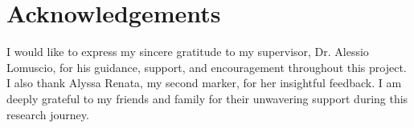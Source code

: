 \chapter*{Acknowledgements}

I would like to express my sincere gratitude to my supervisor, Dr. Alessio Lomuscio, for his guidance, support, and encouragement throughout this project. I also thank Alyssa Renata, my second marker, for her insightful feedback. I am deeply grateful to my friends and family for their unwavering support during this research journey.